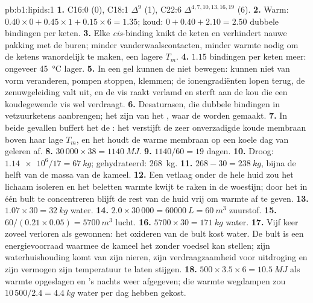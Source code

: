 \begin{solution}{pb:b1:lipids:1}
\textbf{1.} C16:0 (0), C18:1 $\Delta^9$ (1), C22:6 $\Delta^{4,7,10,13,16,19}$
(6).
\textbf{2.} Warm: $0.40\times 0 + 0.45\times 1 + 0.15\times 6 = 1.35$;
koud: $0 + 0.40 + 2.10 = 2.50$ dubbele bindingen per keten.
\textbf{3.} Elke \emph{cis}-binding knikt de keten en verhindert nauwe pakking
met de buren; minder vanderwaalscontacten, minder warmte nodig om de ketens
wanordelijk te maken, een lagere $T_m$.
\textbf{4.} $1.15$ bindingen per keten meer: ongeveer \qty{45}{\celsius} lager.
\textbf{5.} In een gel kunnen de  niet bewegen:  kunnen niet van
vorm veranderen, pompen stoppen,  klemmen; de ionengradiënten lopen terug,
de zenuwgeleiding valt uit, en de vis raakt verlamd en sterft aan de kou die een
koudegewende vis wel verdraagt.
\textbf{6.} Desaturasen, die dubbele bindingen in vetzuurketens aanbrengen; het
zijn  van het , waar de  worden
gemaakt.
\textbf{7.} In beide gevallen buffert het de : het verstijft de zeer
onverzadigde koude membraan boven haar lage $T_m$, en het houdt de warme membraan
op een koele dag van geleren af.
\textbf{8.} $30\,000\times 38 = \qty{1140}{MJ}$.
\textbf{9.} $1140/60 = 19$ dagen.
\textbf{10.} Droog: $\num{1.14e6}/17 = \qty{67}{kg}$; gehydrateerd:
\qty{268}{kg}.
\textbf{11.} $268 - 30 = \qty{238}{kg}$, bijna de helft van de massa van de
kameel.
\textbf{12.} Een vetlaag onder de hele huid zou het lichaam isoleren en het
beletten warmte kwijt te raken in de woestijn; door het  in één bult te
concentreren blijft de rest van de huid vrij om warmte af te geven.
\textbf{13.} $1.07\times 30 = \qty{32}{kg}$ water.
\textbf{14.} $2.0\times 30\,000 = \qty{60000}{L} = \qty{60}{m^3}$
zuurstof.
\textbf{15.} $60/(0.21\times 0.05) = \qty{5700}{m^3}$ lucht.
\textbf{16.} $5700\times 30 = \qty{171}{kg}$ water.
\textbf{17.} Vijf keer zoveel verloren als gewonnen: het oxideren van de bult
kost water. De bult is een energievoorraad waarmee de kameel het zonder voedsel
kan stellen; zijn waterhuishouding komt van zijn nieren, zijn verdraagzaamheid
voor uitdroging en zijn vermogen zijn temperatuur te laten stijgen.
\textbf{18.} $500\times 3.5\times 6 = \qty{10.5}{MJ}$ als warmte opgeslagen en 's nachts weer afgegeven; die warmte wegdampen zou $10\,500/2.4 = \qty{4.4}{kg}$ water per dag hebben gekost.

\end{solution}
